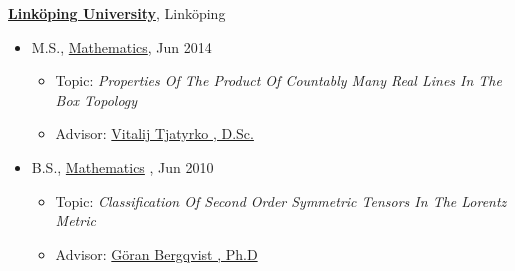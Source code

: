 \documentclass[10pt]{article}
\newenvironment{outerlist}[1][\enskip\textbullet]%
        {\begin{itemize}[#1,leftmargin=*]}{\end{itemize}%
         \vspace{-.6\baselineskip}}
\newenvironment{innerlist}[1][\enskip\textbullet]%
        {\begin{itemize}[#1,leftmargin=*,parsep=0pt,itemsep=0pt,topsep=0pt,partopsep=0pt]}
        {\end{itemize}}
\begin{document}
\href{http://www.liu.se/?l=en&sc=true}{\textbf{Linköping University}},
Linköping
\begin{outerlist}


\item[] M.S.,
        \href{http://www.mai.liu.se/index-e.html}
             {Mathematics},
             Jun 2014
        \begin{innerlist}
        \item Topic: \emph{Properties Of The Product Of Countably 
 Many Real Lines In The Box Topology}
        \item Advisor:
              \href{http://www.mai.liu.se/~vitja/}
                   {Vitalij Tjatyrko , D.Sc.}
        \end{innerlist}
\end{outerlist}
\vspace{.1in}
\begin{outerlist}
\item[] B.S.,
        \href{http://www.mai.liu.se/index-e.html}
             {Mathematics} , Jun 2010
        \begin{innerlist}
        \item Topic: \emph{Classification Of Second Order Symmetric
 Tensors In The Lorentz Metric}
        \item Advisor:
              \href{http://www.mai.liu.se/~gober/}
                   {Göran Bergqvist , Ph.D}
        \end{innerlist}

\end{outerlist}
\end{document}
